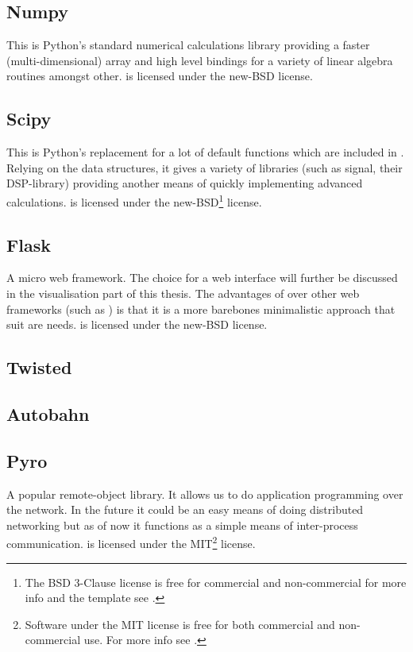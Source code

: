 \documentclass[a4paper, openany, oneside]{memoir}
\begin{document}
\subsection{Numpy}
\label{sec:numpy}
This is Python's standard numerical calculations library providing a faster (multi-dimensional) array and high level bindings for a variety of linear algebra routines amongst other.  is licensed under the new-BSD license.

\subsection{Scipy}
\label{sec:scipy}
This is Python's replacement for a lot of default functions which are included in \matlab{}. Relying on the  data structures, it gives a variety of libraries (such as signal, their DSP-library) providing another means of quickly implementing advanced calculations.  is licensed under the new-BSD\footnote{\label{fn:bsd}The BSD 3-Clause license is free for commercial and non-commercial for more info and the template see \cite{bsdlic}.} license.

\subsection{Flask}
\label{sec:flask}
A micro web framework. The choice for a web interface will further be discussed in the visualisation part of this thesis. The advantages of  over other web frameworks (such as ) is that it is a more barebones minimalistic approach that suit are needs.  is licensed under the new-BSD license.

\subsection{Twisted}
\label{sub:twisted}

\subsection{Autobahn}
\label{sub:autobahn}


\subsection{Pyro}
\label{sec:pyro}
A popular remote-object library. It allows us to do application programming over the network. In the future it could be an easy means of doing distributed networking but as of now it functions as a simple means of inter-process communication.  is licensed under the MIT\footnote{\label{fn:mit}Software under the MIT license is free for both commercial and non-commercial use. For more info see \cite{mitlic}.} license.
\end{document}
